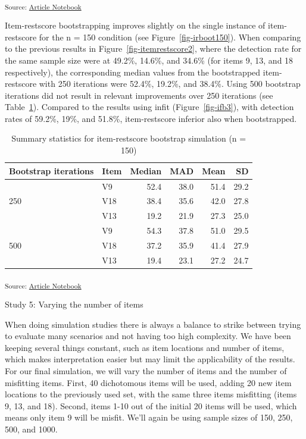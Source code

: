 \documentclass[
  letterpaper,
  DIV=11,
  numbers=noendperiod]{scrartcl}
\begin{document}
\textsubscript{Source:
\href{https://pgmj.github.io/rasch_itemfit/index.qmd.html}{Article
Notebook}}

Item-restscore bootstrapping improves slightly on the single instance of
item-restscore for the n = 150 condition (see
Figure~\ref{fig-irboot150}). When comparing to the previous results in
Figure~\ref{fig-itemrestscore2}, where the detection rate for the same
sample size were at 49.2\%, 14.6\%, and 34.6\% (for items 9, 13, and 18
respectively), the corresponding median values from the bootstrapped
item-restscore with 250 iterations were 52.4\%, 19.2\%, and 38.4\%.
Using 500 bootstrap iterations did not result in relevant improvements
over 250 iterations (see Table~\ref{tbl-irb150mis}). Compared to the
results using infit (Figure~\ref{fig-ifb3}), with detection rates of
59.2\%, 19\%, and 51.8\%, item-restscore inferior also when
bootstrapped.

\begin{longtable}[]{@{}llrrrr@{}}

\caption{\label{tbl-irb150mis}Summary statistics for item-restscore
bootstrap simulation (n = 150)}

\tabularnewline

\toprule\noalign{}
Bootstrap iterations & Item & Median & MAD & Mean & SD \\
\midrule\noalign{}
\endhead
\bottomrule\noalign{}
\endlastfoot
& V9 & 52.4 & 38.0 & 51.4 & 29.2 \\
250 & V18 & 38.4 & 35.6 & 42.0 & 27.8 \\
& V13 & 19.2 & 21.9 & 27.3 & 25.0 \\
& V9 & 54.3 & 37.8 & 51.0 & 29.5 \\
500 & V18 & 37.2 & 35.9 & 41.4 & 27.9 \\
& V13 & 19.4 & 23.1 & 27.2 & 24.7 \\

\end{longtable}

\textsubscript{Source:
\href{https://pgmj.github.io/rasch_itemfit/index.qmd.html}{Article
Notebook}}

Study 5: Varying the number of items

When doing simulation studies there is always a balance to strike
between trying to evaluate many scenarios and not having too high
complexity. We have been keeping several things constant, such as item
locations and number of items, which makes interpretation easier but may
limit the applicability of the results. For our final simulation, we
will vary the number of items and the number of misfitting items. First,
40 dichotomous items will be used, adding 20 new item locations to the
previously used set, with the same three items misfitting (items 9, 13,
and 18). Second, items 1-10 out of the initial 20 items will be used,
which means only item 9 will be misfit. We'll again be using sample
sizes of 150, 250, 500, and 1000.
\end{document}
